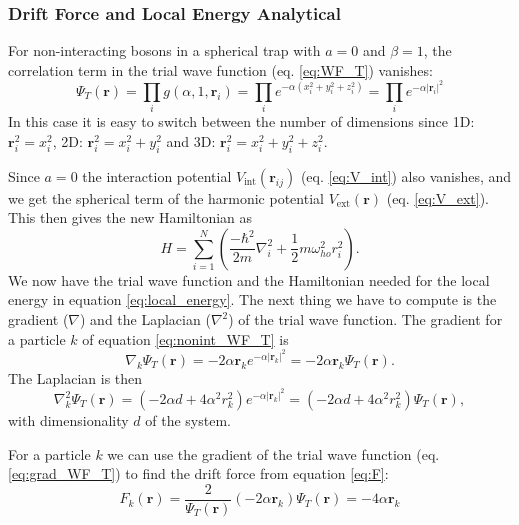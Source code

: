 \documentclass[12pt,a4paper,english]{article}
\begin{document}
\subsubsection{Drift Force and Local Energy Analytical}
\label{subsubsect:EL_analytic}
For non-interacting bosons in a spherical trap with $a=0$ and $\beta=1$, the correlation term in the trial wave function (eq. \ref{eq:WF_T}) vanishes:
\begin{equation}
\label{eq:nonint_WF_T}
\Psi_T(\textbf{r})=\prod_i g(\alpha,1,\mathbf{r}_i)=\prod_{i}e^{-\alpha(x_i^2+y_i^2+z_i^2)}=\prod_{i}e^{-\alpha|\textbf{r}_i|^2}
\end{equation}
In this case it is easy to switch between the number of dimensions since 1D: $\textbf{r}_i^2=x_i^2$, 2D: $\textbf{r}_i^2=x_i^2+y_i^2$ and 3D: $\textbf{r}_i^2=x_i^2+y_i^2+z_i^2$.

Since $a=0$ the interaction potential $V_{\text{int}}(\textbf{r}_{ij})$ (eq. \ref{eq:V_int}) also vanishes, and we get the spherical term of the harmonic potential $V_{\text{ext}}(\textbf{r})$ (eq. \ref{eq:V_ext}). This then gives the new Hamiltonian as
\begin{equation}
\label{eq:non-int_H}
H=\sum_{i=1}^N\left(\frac{-\hbar^2}{2m}\nabla_i^2+\frac{1}{2}m\omega_{ho}^2r_i^2\right).
\end{equation}
We now have the trial wave function and the Hamiltonian needed for the local energy in equation \ref{eq:local_energy}. The next thing we have to compute is the gradient ($\nabla$) and the Laplacian ($\nabla^2$) of the trial wave function. The gradient for a particle $k$ of equation \ref{eq:nonint_WF_T} is
\begin{equation}
\label{eq:grad_WF_T}
\nabla_k\Psi_T(\textbf{r})=-2\alpha \textbf{r}_ke^{-\alpha|\textbf{r}_k|^2}=-2\alpha \textbf{r}_k\Psi_T(\textbf{r}).
\end{equation} 
The Laplacian is then
\begin{equation}
\label{eq:Laplacian_WF_T}
\nabla_k^2\Psi_T(\textbf{r})=(-2\alpha d+4\alpha^2r_k^2)e^{-\alpha|\textbf{r}_k|^2}=(-2\alpha d+4\alpha^2r_k^2)\Psi_T(\textbf{r}),
\end{equation}
with dimensionality $d$ of the system.

For a particle $k$ we can use the gradient of the trial wave function (eq. \ref{eq:grad_WF_T}) to find the drift force from equation \ref{eq:F}:
\begin{equation}
\label{eq:Drift_F_nonint}
F_k(\textbf{r})=\frac{2}{\Psi_T(\textbf{r})}(-2\alpha \textbf{r}_k)\Psi_T(\textbf{r})=-4\alpha\textbf{r}_k
\end{equation}
\end{document}
